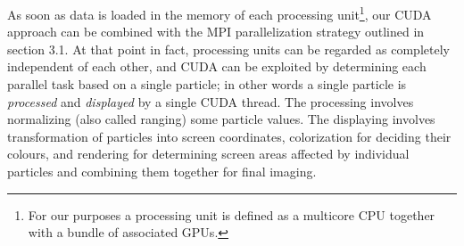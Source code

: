 
As soon as data is loaded in the memory of each processing unit\footnote{For our purposes a processing unit is defined as a multicore CPU together with a bundle of associated GPUs.}, our CUDA approach can be combined with the MPI parallelization strategy outlined in section 3.1. At that point in fact, processing units can be regarded as completely independent of each other, and CUDA can be exploited by determining each parallel task based on a single particle; in other 
words a single particle is {\it processed} and {\it displayed} by a single CUDA thread. 
The processing involves normalizing (also called ranging) some particle values. 
The displaying involves transformation of particles into screen coordinates, colorization 
for deciding their colours, and rendering for determining screen areas affected by individual particles and combining them together for final imaging. 


